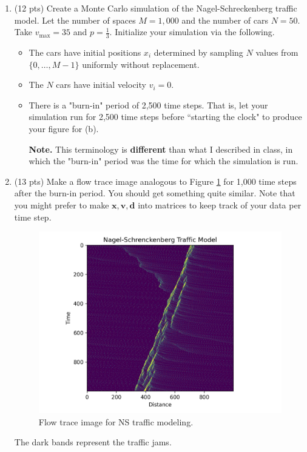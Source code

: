\documentclass[11pt,letterpaper,twoside]{article}
\begin{document}
\begin{enumerate}
\smallskip




\medskip 
\begin{enumerate}
\item (12 pts) Create a Monte Carlo simulation of the Nagel-Schreckenberg traffic model. Let the number of spaces $M = 1,000$ and the number of cars $N = 50$. Take $v_{\max} = 35$ and $p = \frac{1}{3}.$ Initialize your simulation via the following.
\begin{itemize}
\item The cars have initial positions $x_i$ determined by sampling $N$ values from $\{0, \ldots, M - 1\}$ uniformly without replacement.
\item The $N$ cars have initial velocity $v_i = 0$. 
\item There is a "burn-in" period of 2,500 time steps. That is, let your simulation run for 2,500 time steps before ``starting the clock" to produce your figure for (b). 

\textbf{Note.} This terminology is \textbf{different} than what I described in class, in which the "burn-in" period was the time for which the simulation is run.
\end{itemize}
\medskip
\item (13 pts) Make a flow trace image analogous to Figure \ref{NS} for 1,000 time steps after the burn-in period. You should get something quite similar. Note that you might prefer to make $\bm{x}, \bm{v}, \bm{d}$ into matrices to keep track of your data per time step.
\begin{figure}[H]
\centerline{\includegraphics[scale=.7]{NSFig1}}
\caption{Flow trace image for NS traffic modeling.}\label{NS}
\end{figure}
\vspace{-10pt}
The dark bands represent the traffic jams.
\medskip


\end{enumerate}
\end{enumerate}
\end{document}
